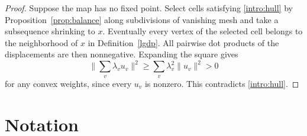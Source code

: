 \documentclass[11pt]{amsart}
\theoremstyle{definition}
\theoremstyle{remark}
\numberwithin{equation}{section}
\begin{document}
\begin{proof}
Suppose the map has no fixed point. Select cells satisfying \eqref{intro:hull} by Proposition~\ref{prop:balance} along subdivisions of vanishing mesh and take a subsequence shrinking to $x$. Eventually every vertex of the selected cell belongs to the neighborhood of $x$ in Definition~\ref{lgdp}. All pairwise dot products of the displacements are then nonnegative. Expanding the square gives
\[
  \Big\|\sum_v\lambda_v u_v\Big\|^2\ge\sum_v\lambda_v^2\|u_v\|^2>0
\]
for any convex weights, since every $u_v$ is nonzero. This contradicts \eqref{intro:hull}.
\end{proof}

\section*{Notation}
\end{document}
